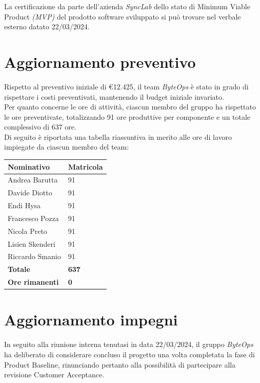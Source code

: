 \documentclass{article}
\begin{document}
La certificazione da parte dell'azienda \textit{SyncLab} dello stato di Minimum Viable Product \textit{(MVP)} del prodotto software sviluppato si può trovare nel verbale esterno datato 22/03/2024.

\section{Aggiornamento preventivo}
Rispetto al preventivo iniziale di €12.425, il team \textit{ByteOps} è stato in grado di rispettare i costi preventivati, mantenendo il budget iniziale invariato. \\
Per quanto concerne le ore di attività, ciascun membro del gruppo ha rispettato le ore preventivate, totalizzando 91 ore produttive per componente e un totale complessivo di 637 ore.\\
Di seguito è riportata una tabella riassuntiva in merito alle ore di lavoro impiegate da ciascun membro del team:
\begin{center}
    \begin{tabular}{|C{4cm}|C{2cm}|}
    \hline
        \textbf{Nominativo} & \textbf{Matricola} \\
        \hline\hline
        Andrea Barutta  & 91 \\
        \hline
        Davide Diotto   & 91 \\ 
        \hline
        Endi Hysa       & 91 \\ 
        \hline
        Francesco Pozza & 91 \\ 
        \hline
        Nicola Preto    & 91 \\ 
        \hline
        Lisien Skenderi & 91 \\ 
        \hline
        Riccardo Smanio & 91 \\ 
        \hline\hline
        \textbf{Totale} & \textbf{637} \\ 
        \hline
        \textbf{Ore rimanenti} & \textbf{0} \\
        \hline
    \end{tabular}
\end{center}

\section{Aggiornamento impegni}
In seguito alla riunione interna tenutasi in data 22/03/2024, il gruppo \textit{ByteOps} ha deliberato di considerare concluso il progetto una volta completata la fase di Product Baseline, rinunciando pertanto alla possibilità di partecipare alla revisione Customer Acceptance.
\end{document}
